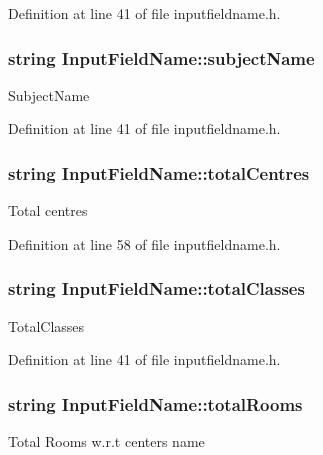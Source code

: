 Definition at line 41 of file inputfieldname.\-h.

\hypertarget{classInputFieldName_a0614731b959afef6bb00f9fc957e7521}{
\subsubsection[{subject\-Name}]{\setlength{\rightskip}{0pt plus 5cm}string Input\-Field\-Name\-::subject\-Name}}\label{classInputFieldName_a0614731b959afef6bb00f9fc957e7521}
Subject\-Name 

Definition at line 41 of file inputfieldname.\-h.

\hypertarget{classInputFieldName_af88ac102ec3a4adbb9edc7c3d61919cb}{
\subsubsection[{total\-Centres}]{\setlength{\rightskip}{0pt plus 5cm}string Input\-Field\-Name\-::total\-Centres}}\label{classInputFieldName_af88ac102ec3a4adbb9edc7c3d61919cb}
Total centres 

Definition at line 58 of file inputfieldname.\-h.

\hypertarget{classInputFieldName_a5bf413dee6dcf29c1872e93f150d48c0}{
\subsubsection[{total\-Classes}]{\setlength{\rightskip}{0pt plus 5cm}string Input\-Field\-Name\-::total\-Classes}}\label{classInputFieldName_a5bf413dee6dcf29c1872e93f150d48c0}
Total\-Classes 

Definition at line 41 of file inputfieldname.\-h.

\hypertarget{classInputFieldName_a51fe8230341d7863ffd4672f2c986beb}{
\subsubsection[{total\-Rooms}]{\setlength{\rightskip}{0pt plus 5cm}string Input\-Field\-Name\-::total\-Rooms}}\label{classInputFieldName_a51fe8230341d7863ffd4672f2c986beb}
Total Rooms w.\-r.\-t centers name 

